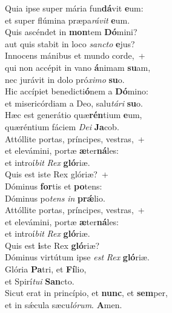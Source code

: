 \evenverse Quia ipse super mária fun\textbf{dá}vit \textbf{e}um:~\*\\
\evenverse et super flúmina præpa\textit{rá}\textit{vit} \textbf{e}um.\\
\oddverse Quis ascéndet in \textbf{mon}tem \textbf{Dó}mini?~\*\\
\oddverse aut quis stabit in loco \textit{san}\textit{cto} \textbf{e}jus?\\
\evenverse Innocens mánibus et mundo corde,~+\\
\evenverse  qui non accépit in vano \textbf{á}nimam \textbf{su}am,~\*\\
\evenverse nec jurávit in dolo pró\textit{xi}\textit{mo} \textbf{su}o.\\
\oddverse Hic accípiet benedicti\textbf{ó}nem a \textbf{Dó}mino:~\*\\
\oddverse et misericórdiam a Deo, salu\textit{tá}\textit{ri} \textbf{su}o.\\
\evenverse Hæc est generátio quæ\textbf{rén}tium \textbf{e}um,~\*\\
\evenverse quæréntium fáciem \textit{De}\textit{i} \textbf{Ja}cob.\\
\oddverse Attóllite portas, príncipes, vestras,~+\\
\oddverse  et elevámini, portæ \textbf{æ}ter\textbf{ná}les:~\*\\
\oddverse et introí\textit{bit} \textit{Rex} \textbf{gló}riæ.\\
\evenverse Quis est iste Rex glóriæ?~+\\
\evenverse  Dóminus \textbf{for}tis et \textbf{po}tens:~\*\\
\evenverse Dóminus po\textit{tens} \textit{in} \textbf{prǽ}lio.\\
\oddverse Attóllite portas, príncipes, vestras,~+\\
\oddverse  et elevámini, portæ \textbf{æ}ter\textbf{ná}les:~\*\\
\oddverse et introí\textit{bit} \textit{Rex} \textbf{gló}riæ.\\
\evenverse Quis est \textbf{i}ste Rex \textbf{gló}riæ?~\*\\
\evenverse Dóminus virtútum ipse \textit{est} \textit{Rex} \textbf{gló}riæ.\\
\oddverse Glória \textbf{Pa}tri, et \textbf{Fí}lio,~\*\\
\oddverse et Spirí\textit{tu}\textit{i} \textbf{San}cto.\\
\evenverse Sicut erat in princípio, et \textbf{nunc}, et \textbf{sem}per,~\*\\
\evenverse et in sǽcula sæcu\textit{ló}\textit{rum}. \textbf{A}men.\\
